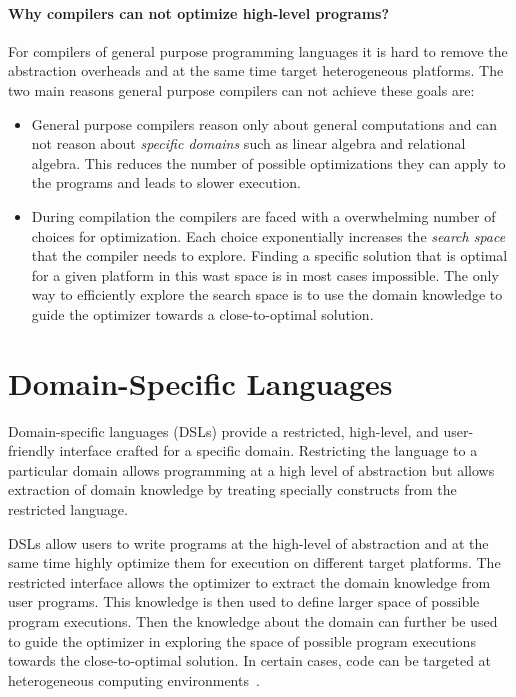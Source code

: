 \paragraph{Why compilers can not optimize high-level programs?} For compilers of general purpose programming languages it is hard to remove the abstraction overheads and at the same time target heterogeneous platforms. The two main
 reasons general purpose compilers can not achieve these goals are:\begin{itemize}

 \item General purpose compilers reason only about general computations and can not reason
   about \emph{specific domains} such as linear algebra and relational algebra. This reduces
   the number of possible optimizations they can apply to the programs and leads to
   slower execution.

 \item During compilation the compilers are faced with a overwhelming number of choices
   for optimization. Each choice exponentially increases the \emph{search space}
   that the compiler needs to explore. Finding a specific solution that is optimal
   for a given platform in this wast space is in most cases impossible. The only way
   to efficiently explore the search space is to use the domain knowledge to guide
   the optimizer towards a close-to-optimal solution.
 \end{itemize}

\section{Domain-Specific Languages}
\label{sec:domain-specific-languages}

Domain-specific languages (DSLs) provide a restricted,
 high-level, and user-friendly interface crafted for a specific domain.
 Restricting the language to a particular domain allows programming at
 a high level of abstraction but allows extraction of domain knowledge by
 treating specially constructs from the restricted language.

DSLs allow users to write programs at the high-level of abstraction and at the
 same time highly optimize them for execution on different target platforms. The restricted interface allows the optimizer to extract the domain knowledge from user programs. This knowledge is then used to define larger space of possible program executions. Then the knowledge about the domain can further be used to guide the optimizer in exploring the space of possible program executions towards the close-to-optimal solution. In certain cases, code can be targeted at
 heterogeneous computing environments~\cite{rompf_optimizing_2013}.

